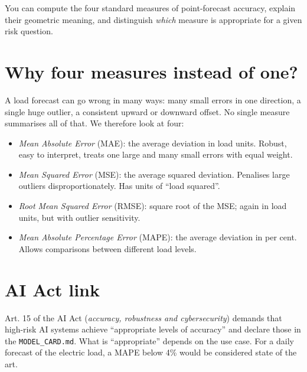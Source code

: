 \documentclass[
  english,
  letterpaper,
]{scrbook}
\providecommand{\tightlist}{%
  \setlength{\itemsep}{0pt}\setlength{\parskip}{0pt}}
\begin{document}
\begin{tcolorbox}[enhanced jigsaw, arc=.35mm, bottomrule=.15mm, bottomtitle=1mm, breakable, colback=white, colbacktitle=quarto-callout-note-color!10!white, colframe=quarto-callout-note-color-frame, coltitle=black, left=2mm, leftrule=.75mm, opacityback=0, opacitybacktitle=0.6, rightrule=.15mm, title=\textcolor{quarto-callout-note-color}{\faInfo}\hspace{0.5em}{Learning objective}, titlerule=0mm, toprule=.15mm, toptitle=1mm]

You can compute the four standard measures of point-forecast accuracy,
explain their geometric meaning, and distinguish \emph{which} measure is
appropriate for a given risk question.

\end{tcolorbox}

\section{Why four measures instead of
one?}\label{why-four-measures-instead-of-one}

A load forecast can go wrong in many ways: many small errors in one
direction, a single huge outlier, a consistent upward or downward
offset. No single measure summarises all of that. We therefore look at
four:

\begin{itemize}
\tightlist
\item
  \emph{Mean Absolute Error} (MAE): the average deviation in load units.
  Robust, easy to interpret, treats one large and many small errors with
  equal weight.
\item
  \emph{Mean Squared Error} (MSE): the average squared deviation.
  Penalises large outliers disproportionately. Has units of ``load
  squared''.
\item
  \emph{Root Mean Squared Error} (RMSE): square root of the MSE; again
  in load units, but with outlier sensitivity.
\item
  \emph{Mean Absolute Percentage Error} (MAPE): the average deviation in
  per cent. Allows comparisons between different load levels.
\end{itemize}

\section{AI Act link}\label{ai-act-link-5}

Art. 15 of the AI Act (\emph{accuracy, robustness and cybersecurity})
demands that high-risk AI systems achieve ``appropriate levels of
accuracy'' and declare those in the \texttt{MODEL\_CARD.md}. What is
``appropriate'' depends on the use case. For a daily forecast of the
electric load, a MAPE below 4\% would be considered state of the art.
\end{document}
